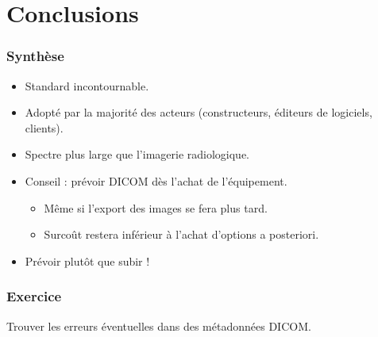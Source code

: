 \section{Conclusions}

\frame
{
	\frametitle{Synth\`ese}
	
	\begin{itemize}
		\item Standard incontournable.
		\item Adopt\'e par la majorit\'e des acteurs (constructeurs, \'editeurs de logiciels, clients).
		\item Spectre plus large que l'imagerie radiologique.
		\item Conseil : pr\'evoir DICOM d\`es l'achat de l'\'equipement.
		\begin{itemize}
			\item M\^eme si l'export des images se fera plus tard.
			\item Surco\^ut restera inf\'erieur \`a l'achat d'options a posteriori.
		\end{itemize}
		\item Pr\'evoir plut\^ot que subir !
	\end{itemize}
}

\frame
{
    \frametitle{Exercice}
    Trouver les erreurs \'eventuelles dans des m\'etadonn\'ees DICOM.
}

